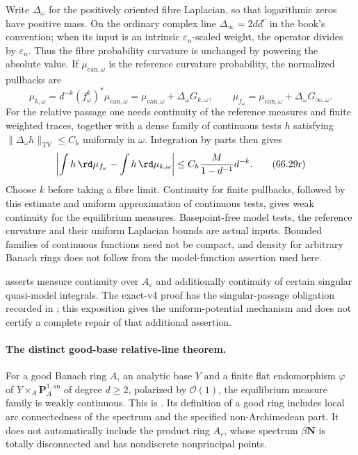 Write $\Delta_\omega$ for the positively oriented fibre Laplacian,
so that logarithmic zeros have positive mass. On the ordinary complex
line $\Delta_\infty=2dd^c$ in the book's convention; when its input is
an intrinsic $\varepsilon_n$-scaled weight, the operator divides by
$\varepsilon_n$. Thus the fibre probability curvature is unchanged
by powering the absolute value. If $\mu_{\mathrm{can},\omega}$
is the reference curvature probability, the normalized pullbacks are
\[
 \mu_{k,\omega}=d^{-k}(f_\omega^k)^*\mu_{\mathrm{can},\omega}
      =\mu_{\mathrm{can},\omega}+\Delta_\omega G_{k,\omega},
 \qquad
 \mu_{f_\omega}=\mu_{\mathrm{can},\omega}
                                   +\Delta_\omega G_{\infty,\omega}.
\tag{66.29q}\label{eq:hybrid-sequential-pullback-probabilities}
\]
For the relative passage one needs continuity of the reference measures
and finite weighted traces, together with a dense family of continuous
tests $h$ satisfying $\|\Delta_\omega h\|_{\mathrm{TV}}\leq C_h$
uniformly in $\omega$. Integration by parts then gives
\[
 \left|\int h\,\rd\mu_{f_\omega}
                  -\int h\,\rd\mu_{k,\omega}\right|
       \leq C_h\frac{M}{1-d^{-1}}d^{-k}.
\tag{66.29r}\label{eq:hybrid-sequential-test-tail}
\]
Choose $k$ before taking a fibre limit. Continuity for finite pullbacks,
followed by this estimate and uniform approximation of continuous
tests, gives weak continuity for the equilibrium measures. Basepoint-free
model tests, the reference curvature and their uniform Laplacian bounds
are actual inputs. Bounded families of continuous functions need not
be compact, and density for arbitrary Banach rings does not follow
from the model-function assertion used here.

\cite[Theorem~5.8]{FavreGong26SequentialV4} asserts measure continuity
over $A_\varepsilon$ and additionally continuity of certain singular
quasi-model integrals. The exact-v4 proof has the singular-passage
obligation recorded in ; this
exposition gives the uniform-potential mechanism and does not certify
a complete repair of that additional assertion.

\paragraph{The distinct good-base relative-line theorem.}
For a good Banach ring $A$, an analytic base $Y$ and a finite flat
endomorphism $\varphi$ of $Y\times_A\mathbf P^{1,\mathrm{an}}_A$
of degree $d\geq2$, polarized by $\mathcal O(1)$, the equilibrium
measure family is weakly continuous. This is
\cite[Theorem~A and Theorem~6.26]{Poi25DynamicsZV5}.
Its definition of a good ring includes local arc connectedness of
the spectrum and the specified non-Archimedean part. It does not
automatically include the product ring $A_\varepsilon$, whose spectrum
$\beta\mathbf N$ is totally disconnected and has nondiscrete
nonprincipal points.

